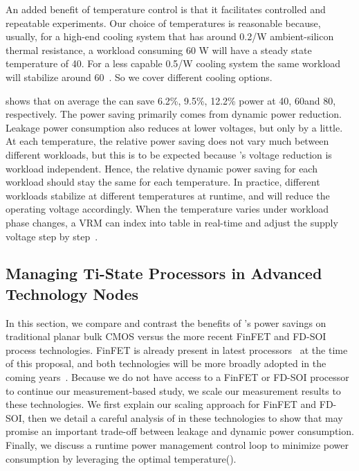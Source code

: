An added benefit of temperature control is that it facilitates controlled and repeatable experiments. Our choice of temperatures is reasonable because, usually, for a high-end cooling system that has around 0.2\C/W ambient-silicon thermal resistance, a workload consuming 60 W will have a steady state temperature of 40\C. For a less capable 0.5\C/W cooling system the same workload will stabilize around 60\C~\cite{skadron2004temperature,huang2006hotspot,fan2016computational}. So we cover different cooling options.

 shows that on average the \tistates can save 6.2\%, 9.5\%, 12.2\% power at 40\C, 60\C and 80\C, respectively. The power saving primarily comes from dynamic power reduction. Leakage power consumption also reduces at lower voltages, but only by a little. At each temperature, the relative power saving does not vary much between different workloads, but this is to be expected because \tistate's voltage reduction is workload independent. Hence, the relative dynamic power saving for each workload should stay the same for each temperature. In practice, different workloads stabilize at different temperatures at runtime, and \tistate will reduce the operating voltage accordingly. When the temperature varies under workload phase changes, a VRM can index into \tistate table in real-time and adjust the supply voltage step by step~\cite{sriram2016avfs}.


\subsection{Managing Ti-State Processors in Advanced Technology Nodes}
\label{sec:temperature:manage}

In this section, we compare and contrast the benefits of \tistate's power savings on traditional planar bulk CMOS versus the more recent FinFET and FD-SOI process technologies. FinFET is already present in latest processors~\cite{intel22nm,samsung14nm} at the time of this proposal, and both technologies will be more broadly adopted in the coming years~\cite{wu201316nm,natarajan201414nm,lin2014high,liu2014fdsoi}. Because we do not have access to a FinFET or FD-SOI processor to continue our measurement-based study, we scale our measurement results to these technologies. We first explain our scaling approach for FinFET and FD-SOI, then we detail a careful analysis of \tistates in these technologies to show that \tistates may promise an important trade-off between leakage and dynamic power consumption. Finally, we discuss a runtime power management control loop to minimize power consumption by leveraging the optimal temperature().

